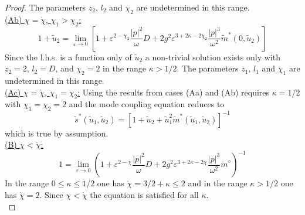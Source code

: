 \documentclass[12pt]{article}
\begin{document}
\begin{proof}
The parameters $z_2$, $l_2$ and $\chi_2$ are undetermined
in this range.\\
\underline{(Ab) $\chi = \mathring{\chi}$, $\chi_1 > \chi_2$:}
\begin{equation}
1+ \tilde{u}_2
= \lim_{\varepsilon \to 0}  \left[1
+ \varepsilon^{2-\chi_2} \frac{|p|^2}{\omega} D  
+ 2 g^2  \varepsilon^{3+2\kappa-2\chi_2} \frac{|p|^3}{\omega^2}
\tilde{m}^{\ast}(0,\tilde{u}_2)
\right]
\label{dMCTLFT4Ab}
\end{equation}
Since the l.h.s. is a function only of $\tilde{u}_2$ a non-trivial
solution exists only with $z_2=2$, $l_2=D$, and $\chi_2 = 2$
in the range $\kappa > 1/2$. The parameters 
$z_1$, $l_1$ and $\chi_1$ are undetermined in this range.
\\
\underline{(Ac) $\chi = \mathring{\chi}$, $\chi_1 = \chi_2$:}
 Using the results from cases (Aa) and (Ab)
requires $\kappa=1/2$ with $\chi_1 = \chi_2 = 2$ and
the mode coupling equation reduces to
\begin{equation}
\tilde{s}^{\ast} (\tilde{u}_1,\tilde{u}_2)
=  \left[1 + \tilde{u}_2 + \tilde{u}_1^2
\tilde{m}^{\ast}(\tilde{u}_1,\tilde{u}_2)
\right]^{-1}
\end{equation}
\label{dMCTLFT4Ac}
which is true by assumption.\\

\noindent \underline{(B) $\chi < \mathring{\chi}$:}
\begin{equation}
1 = \lim_{\varepsilon \to 0}  \left(1
+ \varepsilon^{2-\chi} \frac{|p|^2}{\omega} D  
+ 2 g^2  \varepsilon^{3+2\kappa-2\chi} \frac{|p|^3}{\omega^2}
\tilde{m}^{\diamond}
\right)^{-1}
\label{dMCTLFT4B}
\end{equation}
In the range $0\leq\kappa \leq 1/2$ one has $\mathring{\chi}=3/2+\kappa \leq 2$
and in the range $\kappa > 1/2$ one has $\mathring{\chi}=2$.
Since $\chi < \mathring{\chi}$ the equation is satisfied for all $\kappa$.\\


\end{proof}
\end{document}
